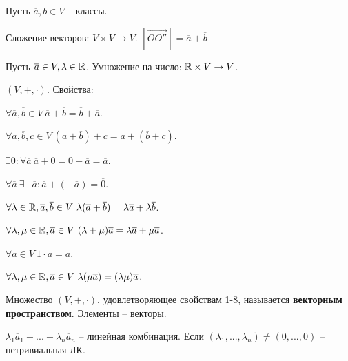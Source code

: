 
	Пусть $\overline{a}, \overline{b} \in V$ -- классы.

	\begin{Def}
		Сложение векторов: $V \times V \to V$.
		$[\overrightarrow{OO''}] = \overline{a} + \overline{b}$ 
	\end{Def}

	\begin{Def}
		Пусть $\overline{a} \in V, \lambda \in \mathbb{R}$. Умножение на число: $\mathbb{R} \times V \to V$.
	\end{Def}
	
	$(V, +, \cdot)$. Свойства:
	\begin{MyList}
		\item $\forall \overline{a}, \overline{b} \in V \ \overline{a} + \overline{b} = \overline{b} + \overline{a}$.
		\item $\forall \overline{a}, \overline{b}, \overline{c} \in V \ (\overline{a} + \overline{b}) + \overline{c} = \overline{a} + (\overline{b} + \overline{c})$.
		\item $\exists \overline{0} : \forall \overline{a} \ \overline{a} + \overline{0} = \overline{0} + \overline{a} = \overline{a}$.
		\item $\forall \overline{a} \ \exists -\overline{a} : \overline{a} + (-\overline{a}) = \overline{0}$.
		\item $\forall \lambda \in \mathbb{R}, \overline{a}, \overline{b} \in V \ \lambda(\overline{a} + \overline{b}) = \lambda \overline{a} + \lambda \overline{b}$.
		\item $\forall \lambda, \mu \in \mathbb{R}, \overline{a} \in V \ (\lambda + \mu) \overline{a} = \lambda \overline{a} + \mu \overline{a}$.
		\item $\forall \overline{a} \in V \ 1 \cdot \overline{a} = \overline{a}$.
		\item $\forall \lambda, \mu \in \mathbb{R}, \overline{a} \in V \ \lambda(\mu \overline{a}) = (\lambda \mu) \overline{a}$.
	\end{MyList} 

	\begin{Def}
		Множество $(V, +, \cdot)$, удовлетворяющее свойствам 1-8, называется \textbf{векторным пространством}. Элементы -- векторы.
	\end{Def}


	\begin{Def}
		$\lambda_1 \overline{a}_1 + ... + \lambda_n \overline{a}_n$ -- линейная комбинация. Если $(\lambda_1, ..., \lambda_n) \neq (0, ..., 0)$ -- нетривиальная ЛК.  
	\end{Def}

